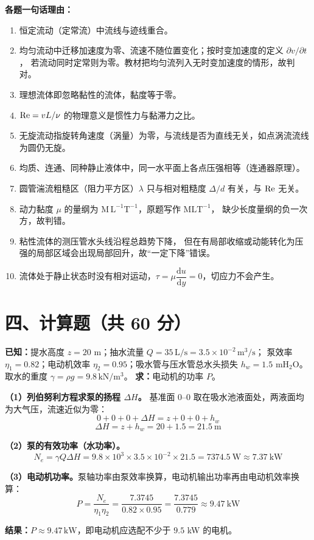 \begin{tishi}
\textbf{各题一句话理由：}
\begin{enumerate}
  \item 恒定流动（定常流）中流线与迹线重合。
  \item 均匀流动中迁移加速度为零、流速不随位置变化；按时变加速度的定义 $\partial v/\partial t$，
        若流动同时定常则为零。教材把均匀流列入无时变加速度的情形，故判对。
  \item 理想流体即忽略黏性的流体，黏度等于零。
  \item $\mathrm{Re}=vL/\nu$ 的物理意义是惯性力与黏滞力之比。
  \item 无旋流动指旋转角速度（涡量）为零，与流线是否为直线无关，如点涡流流线为圆仍无旋。
  \item 均质、连通、同种静止液体中，同一水平面上各点压强相等（连通器原理）。
  \item 圆管湍流粗糙区（阻力平方区）$\lambda$ 只与相对粗糙度 $\Delta/d$ 有关，与 $\mathrm{Re}$ 无关。
  \item 动力黏度 $\mu$ 的量纲为 $\mathrm{M}\,\mathrm{L}^{-1}\mathrm{T}^{-1}$，原题写作 $\mathrm{MLT^{-1}}$，
        缺少长度量纲的负一次方，故判错。
  \item 粘性流体的测压管水头线沿程总趋势下降，
        但在有局部收缩或动能转化为压强的局部区域会出现局部回升，故“一定下降”错误。
  \item 流体处于静止状态时没有相对运动，$\tau=\mu\dfrac{\mathrm{d}u}{\mathrm{d}y}=0$，切应力不会产生。
\end{enumerate}
\end{tishi}

\section{四、计算题（共 60 分）}


\begin{jie}
\textbf{已知：}提水高度 $z=20$ m；抽水流量 $Q=35\,\mathrm{L/s}=3.5\times10^{-2}\,\mathrm{m^3/s}$；
泵效率 $\eta_1=0.82$；电动机效率 $\eta_2=0.95$；吸水管与压水管总水头损失 $h_w=1.5$ mH$_2$O。
取水的重度 $\gamma=\rho g=9.8\,\mathrm{kN/m^3}$。
\textbf{求：}电动机的功率 $P$。

\textbf{（1）列伯努利方程求泵的扬程 $\Delta H$。}
基准面 $0$--$0$ 取在吸水池液面处，两液面均为大气压，流速近似为零：
\[
0+0+0+\Delta H=z+0+0+h_w
\]
\[
\Delta H=z+h_w=20+1.5=21.5\ \mathrm{m}
\]

\textbf{（2）泵的有效功率（水功率）。}
\[
N_e=\gamma Q\Delta H=9.8\times10^3\times3.5\times10^{-2}\times21.5=7374.5\ \mathrm{W}\approx7.37\ \mathrm{kW}
\]

\textbf{（3）电动机功率。}泵轴功率由泵效率换算，电动机输出功率再由电动机效率换算：
\[
P=\frac{N_e}{\eta_1\eta_2}=\frac{7.3745}{0.82\times0.95}=\frac{7.3745}{0.779}\approx9.47\ \mathrm{kW}
\]

\textbf{结果：}$P\approx9.47\,\mathrm{kW}$，即电动机应选配不少于 $9.5$ kW 的电机。
\end{jie}

